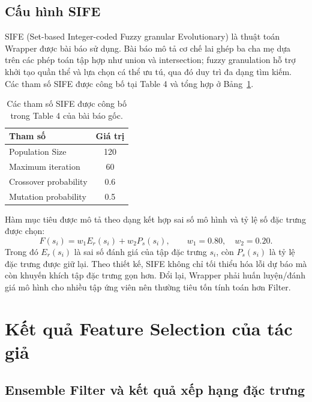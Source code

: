 \subsection{Cấu hình SIFE}

SIFE (Set-based Integer-coded Fuzzy granular Evolutionary) là thuật toán Wrapper được bài báo sử dụng. Bài báo mô tả cơ chế lai ghép ba cha mẹ dựa trên các phép toán tập hợp như union và intersection; fuzzy granulation hỗ trợ khởi tạo quần thể và lựa chọn cá thể ưu tú, qua đó duy trì đa dạng tìm kiếm. Các tham số SIFE được công bố tại Table 4 và tổng hợp ở Bảng~\ref{tab:authors-sife-params}.

\begin{table}[H]
\centering
\small
\caption{Các tham số SIFE được công bố trong Table 4 của bài báo gốc.}
\label{tab:authors-sife-params}
\begin{tabular}{lc}
\toprule
\textbf{Tham số} & \textbf{Giá trị} \\
\midrule
Population Size & 120 \\
Maximum iteration & 60 \\
Crossover probability & 0.6 \\
Mutation probability & 0.5 \\
\bottomrule
\end{tabular}
\end{table}

Hàm mục tiêu được mô tả theo dạng kết hợp sai số mô hình và tỷ lệ số đặc trưng được chọn:
\begin{equation}
 F(s_i)=w_1 E_r(s_i)+w_2 P_s(s_i),\qquad w_1=0.80,\quad w_2=0.20.
 \label{eq:authors-sife-objective}
\end{equation}
Trong đó $E_r(s_i)$ là sai số đánh giá của tập đặc trưng $s_i$, còn $P_s(s_i)$ là tỷ lệ đặc trưng được giữ lại. Theo thiết kế, SIFE không chỉ tối thiểu hóa lỗi dự báo mà còn khuyến khích tập đặc trưng gọn hơn. Đổi lại, Wrapper phải huấn luyện/đánh giá mô hình cho nhiều tập ứng viên nên thường tiêu tốn tính toán hơn Filter.

\section{Kết quả Feature Selection của tác giả}

\subsection{Ensemble Filter và kết quả xếp hạng đặc trưng}

